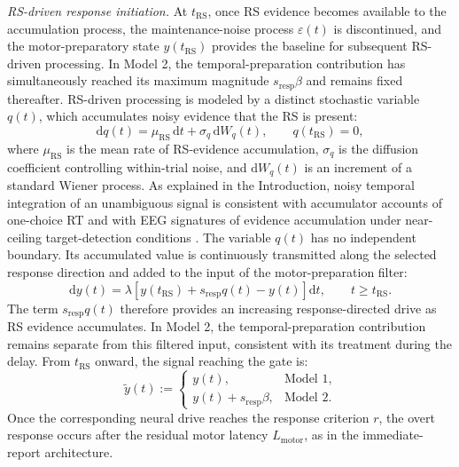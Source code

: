 \documentclass[a4paper,11pt]{article}
\theoremstyle{definition}
\newcommand{\dd}{\mathrm d}
\newcommand{\1}{\mathbbm{1}}
\begin{document}
\emph{RS-driven response initiation.} At $t_{\mathrm{RS}}$, once RS evidence becomes available to the accumulation process, the maintenance-noise process $\varepsilon(t)$ is discontinued, and the motor-preparatory state $y(t_{\mathrm{RS}})$ provides the baseline for subsequent RS-driven processing. In Model 2, the temporal-preparation contribution has simultaneously reached its maximum magnitude $s_{\mathrm{resp}}\beta$ and remains fixed thereafter. RS-driven processing is modeled by a distinct stochastic variable $q(t)$, which accumulates noisy evidence that the RS is present:
\begin{equation}
\dd q(t)=\mu_{\mathrm{RS}}\,\dd t+\sigma_{q}\,\dd W_{q}(t), \qquad q(t_{\mathrm{RS}})=0,
\label{eq:q}
\end{equation}
where $\mu_{\mathrm{RS}}$ is the mean rate of RS-evidence accumulation, $\sigma_{q}$ is the diffusion coefficient controlling within-trial noise, and $\dd W_{q}(t)$ is an increment of a standard Wiener process. As explained in the Introduction, noisy temporal integration of an unambiguous signal is consistent with accumulator accounts of one-choice RT \parencites{ratcliffDiffusionModelOnechoice2011}{smithPsychophysicallyPrincipledModels1995} and with EEG signatures of evidence accumulation under near-ceiling target-detection conditions \parencite{oconnellSupramodalAccumulationtoboundSignal2012}. The variable $q(t)$ has no independent boundary. Its accumulated value is continuously transmitted along the selected response direction and added to the input of the motor-preparation filter:
\begin{equation}
\dd y(t)=\lambda\left[y(t_{\mathrm{RS}})+s_{\mathrm{resp}}q(t)-y(t)\right]\dd t, \qquad t\ge t_{\mathrm{RS}}.
\label{eq:y_RS}
\end{equation}
The term $s_{\mathrm{resp}}q(t)$ therefore provides an increasing response-directed drive as RS evidence accumulates. In Model 2, the temporal-preparation contribution remains separate from this filtered input, consistent with its treatment during the delay. From $t_{\mathrm{RS}}$ onward, the signal reaching the gate is:
\begin{equation}
\tilde{y}(t) := \begin{cases} y(t), & \text{Model 1},\\ y(t)+s_{\mathrm{resp}}\beta, & \text{Model 2}.\end{cases}
\label{eq:tildey_RS}
\end{equation}
Once the corresponding neural drive reaches the response criterion $r$, the overt response occurs after the residual motor latency $L_{\mathrm{motor}}$, as in the immediate-report architecture.
\end{document}
